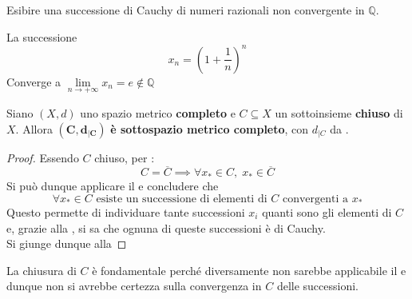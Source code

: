 \begin{exercise}
	Esibire una successione di Cauchy di numeri razionali non convergente in $\mathbb{Q}$.
	\begin{solution}
		La successione
		\[x_n = \left( 1+ \frac{1}{n} \right)^n\]
		Converge a $\lim\limits_{n \to +\infty} x_n = e \notin \mathbb{Q}$
	\end{solution}
\end{exercise}
\begin{proposition}
	\label{prop:subset_compl_e_compl}
	Siano $(X,d)$ uno spazio metrico \textbf{completo} e $C \subseteq X$ un sottoinsieme \textbf{chiuso} di $X$. Allora $\boldsymbol{(C,d_{|C})}$ \textbf{è sottospazio metrico completo}, con $d_{|C}$ da .
	\begin{proof}
		Essendo $C$ chiuso, per :
		\[C = \overline{C} \implies \forall x_* \in C,\; x_* \in \overline{C}\]
		Si può dunque applicare il  e concludere che
		\[\forall x_* \in C \text{ esiste un successione di elementi di $C$ convergenti a $x_*$}\]
		Questo permette di individuare tante successioni $x_i$ quanti sono gli elementi di $C$ e, grazie alla , si sa che ognuna di queste successioni è di Cauchy.\\
		Si giunge dunque alla 
	\end{proof}
	\begin{note}
		\hypertarget{note:subset_compl_e_compl}{}
		La chiusura di $C$ è fondamentale perché diversamente non sarebbe applicabile il  e dunque non si avrebbe certezza sulla convergenza in $C$ delle successioni.
	\end{note}
\end{proposition}
